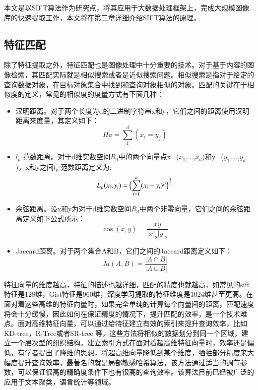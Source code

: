 本文是以SIFT算法作为研究点，将其应用于大数据处理框架上，完成大规模图像库的快速提取工作，本文将在第二章详细介绍SIFT算法的原理。

\subsection{特征匹配}
除了特征提取之外，特征匹配也是图像处理中十分重要的技术。对于基于内容的图像检索，其匹配实际就是相似搜索或者是近似搜索问题。相似搜索是指对于给定的查询数据对象，在目标对象集合中找到和查询对象相似的对象。匹配的关键在于相似度的定义，常见的相似度的度量方式有下面几种：
\begin{itemize}
\item 汉明距离。对于两个长度为d的二进制字符串x和y，它们之间的距离使用汉明距离来度量，其定义如下：
\begin{equation}\label{hanming}
Ha=\sum_{1}^d(x_i=y_j)
\end{equation}

\item $l_p$ 范数距离。对于d维实数空间$R_d$中的两个向量点x=($x_1$,...,$x_d$)和y=($y_1$,...,$y_d$)，x和y之间$l_p$-范数距离定义为:
\begin{equation}\label{fanshu}
L_p(x_i,y_i)=\Bigl(\sum_{l=1}^n(x_i-y_i)^p\Bigr)^\frac{1}{p}
\end{equation}

\item 余弦距离。设x和y为对于d维实数空间$R_d$中两个非零向量，它们之间的余弦距离定义如下公式所示：
\begin{equation}\label{yuxian}
\cos(x,y)=\frac{xy}{|x|_2|y|_2}
\end{equation}

\item Jaccard距离。对于两个集合A和B，它们之间的Jaccard距离定义如下：
\begin{equation}\label{Jaccard}
Ja(A,B)=\frac{|{A}\cap{B}|}{|{A}\cup{B}|}
\end{equation}
\end{itemize}

特征向量的维度越高，特征的描述也越详细，匹配的精度也就越高，如常见的sift特征是128维，Gist特征是960维，深度学习提取的特征维度是1024维甚至更高。在面对着这些高维的特征向量时，如果完全单纯的计算每个向量间的距离，匹配速度将会十分缓慢，因此如何在保证精度的情况下，提升匹配的效率，是一个技术难点。面对高维特征向量，可以通过给特征建立有效的索引来提升查询效率，比如KD-tree，R-Tree或者SR-tree 等，这些方法将相似的数据划分到同一个区域，建立一个层次型的组织结构。建立索引方式在面对着超高维特征向量时，效率还是偏低，有学者提出了降维的思想，将超高维向量降低到某个维度，牺牲部分精度来大幅度提升查询效率，最著名的就是局部敏感哈希算法，该方法通过适当的调节参数，可以保证很高的精确度条件下也有很高的查询效率。该算法目前已经被广泛的应用于文本聚类，语言统计等领域。

